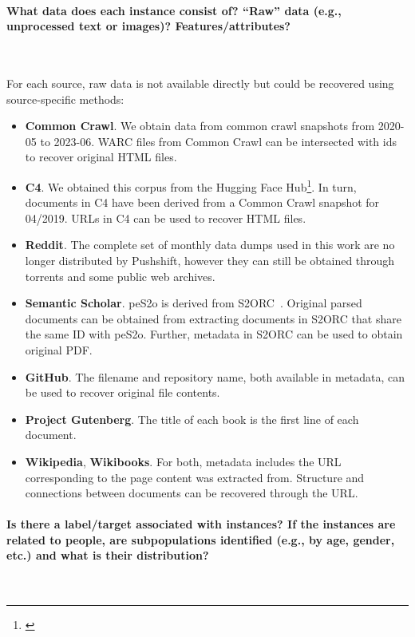 \paragraph{What data does each instance consist of? ``Raw'' data (e.g., unprocessed text or images)? Features/attributes?}~

For each source, raw data is not available directly but could be recovered using source-specific methods:

\begin{itemize}[leftmargin=1em]
    \item \textbf{Common Crawl}. We obtain data from common crawl snapshots from 2020-05 to 2023-06. WARC files from Common Crawl can be intersected with \dolma ids to recover original HTML files.
    \item \textbf{C4}. We obtained this corpus from the Hugging Face Hub\footnote{\label{foot:c4}\href{https://huggingface.co/datasets/allenai/c4}{}}. In turn, documents in C4 have been derived from a Common Crawl snapshot for 04/2019. URLs in C4 can be used to recover HTML files.
    \item \textbf{Reddit}. The complete set of monthly data dumps used in this work are no longer distributed by Pushshift, however they can still be obtained through torrents and some public web archives.   
    \item \textbf{Semantic Scholar}. peS2o is derived from S2ORC~\citep{lo-etal-2020-s2orc}. Original parsed documents can be obtained from extracting documents in S2ORC that share the same ID with peS2o. Further, metadata in S2ORC can be used to obtain original PDF.
    \item \textbf{GitHub}. The filename and repository name, both available in metadata, can be used to recover original file contents.
    \item \textbf{Project Gutenberg}. The title of each book is the first line of each document.
    \item \textbf{Wikipedia}, \textbf{Wikibooks}. For both, metadata includes the URL corresponding to the page content was extracted from. Structure and connections between documents can be recovered through the URL.
\end{itemize}


\paragraph{Is there a label/target associated with instances? If the instances are related to people, are subpopulations identified (e.g., by age, gender, etc.) and what is their distribution?}~


